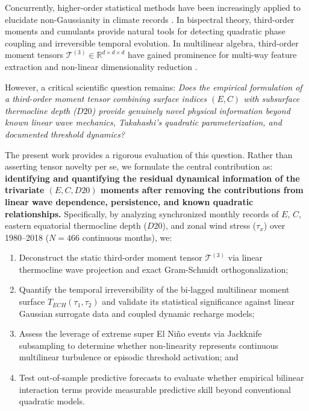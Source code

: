 \documentclass[11pt,a4paper]{article}
\begin{document}
Concurrently, higher-order statistical methods have been increasingly applied to elucidate non-Gaussianity in climate records \citep{monahan2004spatial, pires2021bispectral}. In bispectral theory, third-order moments and cumulants provide natural tools for detecting quadratic phase coupling and irreversible temporal evolution. In multilinear algebra, third-order moment tensors $\mathcal{T}^{(3)} \in \mathbb{R}^{d \times d \times d}$ have gained prominence for multi-way feature extraction and non-linear dimensionality reduction \citep{kolda2009tensor, comon2014tensors}.

However, a critical scientific question remains: \textit{Does the empirical formulation of a third-order moment tensor combining surface indices $(E, C)$ with subsurface thermocline depth ($D20$) provide genuinely novel physical information beyond known linear wave mechanics, Takahashi's quadratic parameterization, and documented threshold dynamics?}

The present work provides a rigorous evaluation of this question. Rather than asserting tensor novelty per se, we formulate the central contribution as: \textbf{identifying and quantifying the residual dynamical information of the trivariate $(E, C, D20)$ moments after removing the contributions from linear wave dependence, persistence, and known quadratic relationships.} Specifically, by analyzing synchronized monthly records of $E$, $C$, eastern equatorial thermocline depth ($D20$), and zonal wind stress ($\tau_x$) over 1980--2018 ($N = 466$ continuous months), we:
\begin{enumerate}
    \item Deconstruct the static third-order moment tensor $\mathcal{T}^{(3)}$ via linear thermocline wave projection and exact Gram-Schmidt orthogonalization;
    \item Quantify the temporal irreversibility of the bi-lagged multilinear moment surface $T_{ECH}(\tau_1, \tau_2)$ and validate its statistical significance against linear Gaussian surrogate data and coupled dynamic recharge models;
    \item Assess the leverage of extreme super El Ni\~no events via Jackknife subsampling to determine whether non-linearity represents continuous multilinear turbulence or episodic threshold activation; and
    \item Test out-of-sample predictive forecasts to evaluate whether empirical bilinear interaction terms provide measurable predictive skill beyond conventional quadratic models.
\end{enumerate}
\end{document}
